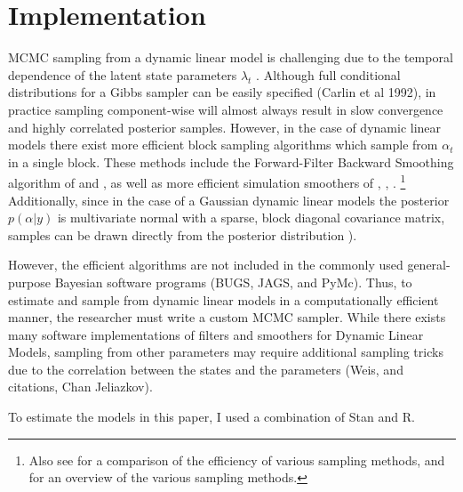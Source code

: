 \documentclass{article}
\begin{document}
\section{Implementation}
\label{sec:implementation}

MCMC sampling from a dynamic linear model is challenging due to the temporal dependence of the latent state parameters $\lambda_{t}$ \parencite{ReisSalazarGamerman2006}.
Although full conditional distributions for a Gibbs sampler can be easily specified (Carlin et al 1992), in practice sampling component-wise will almost always result in slow convergence and highly correlated posterior samples.
However, in the case of dynamic linear models there exist more efficient block sampling algorithms which sample from $\alpha_{t}$ in a single block.
These methods include the Forward-Filter Backward Smoothing algorithm of \textcite{CarterKohn1994} and \textcite{Fruehwirth-Schnatter1994}, as well as more efficient simulation smoothers of \textcite{DeJongShephard1995}, \textcite{DurbinKoopman2002}, \textcite{StricklandTurnerDenhamEtAl2009}.%
\footnote{Also see \textcite{ReisSalazarGamerman2006} for a comparison of the efficiency of various sampling methods, and \textcite{migon2005dynamic} for an overview of the various sampling methods.}
Additionally, since in the case of a Gaussian dynamic linear models the posterior $p(\alpha | y)$ is multivariate normal with a sparse, block diagonal covariance matrix, samples can be drawn directly from the posterior distribution \parencites{migon2005dynamic}{ChanJeliazkov2009}).

However, the efficient algorithms are not included in the commonly used general-purpose Bayesian software programs (BUGS, JAGS, and PyMc).
Thus, to estimate and sample from dynamic linear models in a computationally efficient manner, the researcher must write a custom MCMC sampler.
While there exists many software implementations of filters and smoothers for Dynamic Linear Models, sampling from other parameters may require additional sampling tricks due to the correlation between the states and the parameters (Weis, and citations, Chan Jeliazkov).

To estimate the models in this paper, I used a combination of Stan and R.
\end{document}
